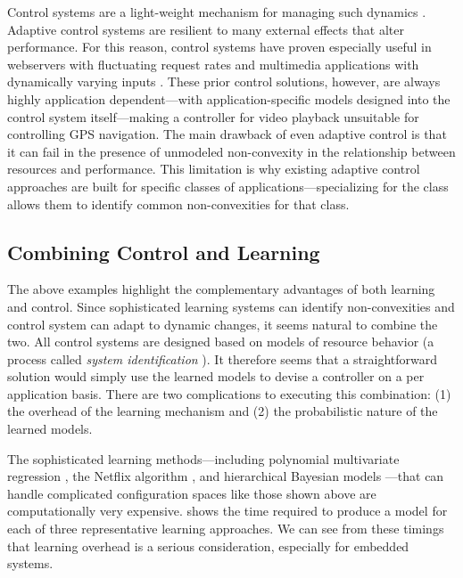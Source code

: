 Control systems are a light-weight mechanism for managing such
dynamics \cite{Hellerstein2004a}. Adaptive control systems are
resilient to many external effects that alter performance.  For this
reason, control systems have proven especially useful in webservers
with fluctuating request rates
\cite{Horvarth,LuEtAl-2006a,SunDaiPan-2008a} and multimedia
applications with dynamically varying inputs
\cite{TCST,Agilos,grace2}.  These prior control solutions, however,
are always highly application dependent---with application-specific
models designed into the control system itself---making a controller
for video playback unsuitable for controlling GPS navigation.  The
main drawback of even adaptive control is that it can fail in the
presence of unmodeled non-convexity in the relationship between
resources and performance.  This limitation is why existing adaptive
control approaches are built for specific classes of
applications---specializing for the class allows them to identify
common non-convexities for that class.

\subsection{Combining Control and Learning}
The above examples highlight the complementary advantages of both
learning and control.  Since sophisticated learning systems can
identify non-convexities and control system can adapt to dynamic
changes, it seems natural to combine the two.  All control systems are
designed based on models of resource behavior (a process called
\emph{system identification} \cite{ControlHandbook}).  It therefore
seems that a straightforward solution would simply use the learned
models to devise a controller on a per application basis.
There are two complications to executing this combination: (1) the
overhead of the learning mechanism and (2) the probabilistic nature of
the learned models.  

The sophisticated learning methods---including polynomial multivariate
regression \cite{}, the Netflix algorithm \cite{}, and hierarchical
Bayesian models \cite{}---that can handle complicated configuration
spaces like those shown above are computationally very expensive.
\tblref{} shows the time required to produce a model for each of three
representative learning approaches.  We can see from these timings
that learning overhead is a serious consideration, especially for
embedded systems.

